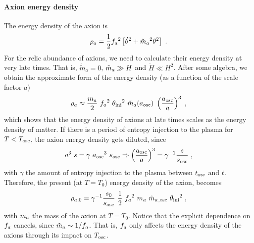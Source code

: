 \documentclass[11pt,a4paper]{article}
\begin{document}
\paragraph{Axion energy density}
%
The energy density of the axion is 
%
\begin{eqnarray}
	\rho_{a} = \dfrac{1}{2} f_{a}{}^2 \left[  \dot{\theta}^2 + \tilde m_{a}{}^2 \theta^2  \right] \;.
	\label{eq:rho_a_def} 
\end{eqnarray}
%
For the relic abundance of axions, we need to calculate their energy density at very late times. That is, $\dot{\tilde{m}}_a = 0$, $\tilde m_{a}{} \gg H$ and $\dot H \ll H^2$. After some algebra, we obtain the approximate form of the energy density (as a function of the scale factor $a$) 
%
\begin{eqnarray}
	\rho_{a} \approx \dfrac{m_{a}{} }{2}  \ f_{a}{}^2 \ \theta_{\rm ini}{}^2  \ \tilde m_{a}{}(a_{\rm osc}{}) \ \left( \dfrac{a_{\rm osc}{}}{a} \right)^3 \;,
	\label{eq:rho_a0} 
\end{eqnarray}
%
which shows that the energy density of axions at late times scales as the energy density of matter. If there is a period of entropy injection to the plasma for $T<T_{\rm osc}{}$, the axion energy density gets diluted, since 
%
\begin{equation}
	a^3 \ s = \gamma \ \aosc^3 \ s_{\rm osc} \Rightarrow  \lrb{\dfrac{\aosc}{a}}^3 = \gamma^{-1} \dfrac{s}{s_{\rm osc}} \;,
	\label{eq:WKB_gamma_def}
\end{equation}
%
with $\gamma$ the amount of entropy injection to the plasma between $t_{\rm osc}{}$ and $t$. Therefore, the present (at $T=T_0$) energy density of the axion, becomes
%
\begin{eqnarray}
	\rho_{a,0} = \gamma^{-1}  \dfrac{s_0}{s_{\rm osc}} \  \dfrac{1 }{2}  \ f_{a}{}^2 \ m_{a}{} \ \tilde m_{a}{}_{,{\rm osc}} \ \theta_{\rm ini}{}^2    \;,
	\label{eq:rho_a_approx} 
\end{eqnarray}
with $m_{a}{}$ the mass of the axion at $T=T_0$. Notice that the explicit dependence on $f_{a}{}$ cancels, since $\tilde m_{a}{} \sim 1/f_{a}{}$. That is, $f_{a}{}$ only affects the energy density of the axions through its impact on $T_{\rm osc}{}$. 
%
\end{document}

